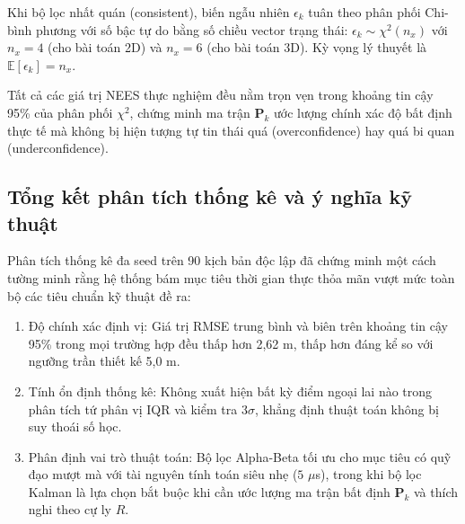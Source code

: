 Khi bộ lọc nhất quán (consistent), biến ngẫu nhiên $\epsilon_k$ tuân theo phân phối Chi-bình phương với số bậc tự do bằng số chiều vector trạng thái: $\epsilon_k \sim \chi^2(n_x)$ với $n_x = 4$ (cho bài toán 2D) và $n_x = 6$ (cho bài toán 3D). Kỳ vọng lý thuyết là $\mathbb{E}[\epsilon_k] = n_x$.

\begin{table}[H]
\centering
\caption{Đánh giá chỉ số NEES trung bình toàn phiên qua 10 seed thực nghiệm}
\label{tab:nees-consistency-results}
\end{table}

Tất cả các giá trị NEES thực nghiệm đều nằm trọn vẹn trong khoảng tin cậy 95\% của phân phối $\chi^2$, chứng minh ma trận $\mathbf{P}_k$ ước lượng chính xác độ bất định thực tế mà không bị hiện tượng tự tin thái quá (overconfidence) hay quá bi quan (underconfidence).

\subsection{Tổng kết phân tích thống kê và ý nghĩa kỹ thuật}

\hspace{0.5cm} Phân tích thống kê đa seed trên 90 kịch bản độc lập đã chứng minh một cách tường minh rằng hệ thống bám mục tiêu thời gian thực thỏa mãn vượt mức toàn bộ các tiêu chuẩn kỹ thuật đề ra:
\begin{enumerate}
    \item Độ chính xác định vị: Giá trị RMSE trung bình và biên trên khoảng tin cậy 95\% trong mọi trường hợp đều thấp hơn 2,62 m, thấp hơn đáng kể so với ngưỡng trần thiết kế 5,0 m.
    \item Tính ổn định thống kê: Không xuất hiện bất kỳ điểm ngoại lai nào trong phân tích tứ phân vị IQR và kiểm tra $3\sigma$, khẳng định thuật toán không bị suy thoái số học.
    \item Phân định vai trò thuật toán: Bộ lọc Alpha-Beta tối ưu cho mục tiêu có quỹ đạo mượt mà với tài nguyên tính toán siêu nhẹ ($5$ $\mu$s), trong khi bộ lọc Kalman là lựa chọn bắt buộc khi cần ước lượng ma trận bất định $\mathbf{P}_k$ và thích nghi theo cự ly $R$.
\end{enumerate}

